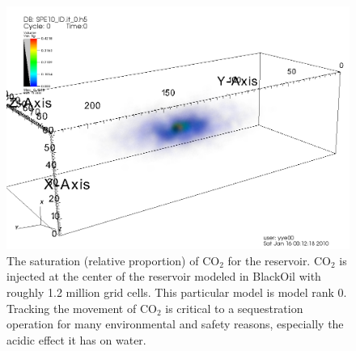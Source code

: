 \documentclass{acm_proc_article-sp}
\newcommand{\jhanote}[1]{ {\textcolor{red} { ***Jha: #1 }}}
\newcommand{\jhanote}[1]{}
\begin{document}
\begin{figure}
\begin{center}
\includegraphics[scale=0.2]{figures/visit0001.png} 
\end{center}
\caption[Simulation Output]{The saturation (relative proportion) of
  CO$_2$ for the reservoir. CO$_2$ is injected at the center of the
  reservoir modeled in BlackOil with roughly 1.2 million grid cells.
  This particular model is model rank $0$. Tracking the movement of
  CO$_2$ is critical to a sequestration operation for many environmental
  and safety reasons, especially the acidic effect it has on water.
 }
\label{fig:saturation}
\end{figure}
\end{document}
